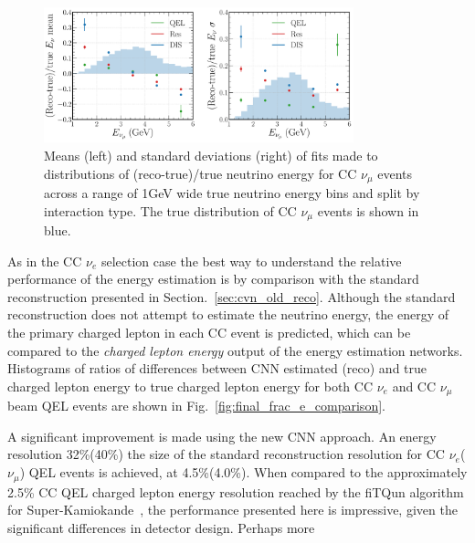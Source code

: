 \begin{figure} %
    \includegraphics[width=0.8\textwidth]{diagrams/6-cvn/chipsnet/final_energy_numu.pdf}
    \caption[Means and standard deviations of fits to $\nu_{\mu}$ energy distributions.]
    {Means (left) and standard deviations (right) of fits made to distributions of
        (reco-true)/true neutrino energy for CC $\nu_{\mu}$ events across a range of \unit{1}{GeV}
        wide true neutrino energy bins and split by interaction type. The true distribution of CC
        $\nu_{\mu}$ events is shown in blue.}
    \label{fig:final_energy_numu}
\end{figure}

As in the CC $\nu_{e}$ selection case the best way to understand the relative performance of the
energy estimation is by comparison with the standard reconstruction presented in
Section.~\ref{sec:cvn_old_reco}. Although the standard reconstruction does not attempt to estimate
the neutrino energy, the energy of the primary charged lepton in each CC event is predicted, which
can be compared to the \emph{charged lepton energy} output of the energy estimation networks.
Histograms of ratios of differences between CNN estimated (reco) and true charged lepton energy to
true charged lepton energy for both CC $\nu_{e}$ and CC $\nu_{\mu}$ beam QEL events are shown in
Fig.~\ref{fig:final_frac_e_comparison}.

A significant improvement is made using the new CNN approach. An energy resolution 32\%(40\%) the
size of the standard reconstruction resolution for CC $\nu_{e}$($\nu_{\mu}$) QEL events is
achieved, at 4.5\%(4.0\%). When compared to the approximately 2.5\% CC QEL charged lepton energy
resolution reached by the fiTQun algorithm for Super-Kamiokande~\cite{jiang2019}, the performance
presented here is impressive, given the significant differences in detector design. Perhaps more

